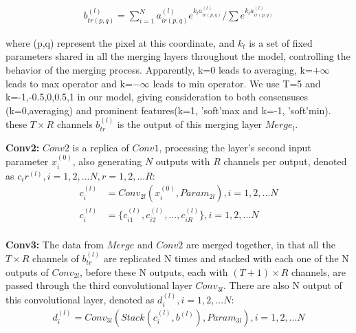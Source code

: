 \begin{equation}\label{eq:6}
    \begin{split}
        b_{tr(p,q)}^{(l)} = \sum_{i=1}^{N} a_{ir(p,q)}^{(l)} e^{k_t a_{ir(p,q)}^{(l)}} /\sum e^{k_t a_{ir(p,q)}^{(l)}}
\end{split}
\end{equation}

where (p,q) represent the pixel at this coordinate, and $k_t$ is a set of fixed parameters shared in all the merging layers throughout the model, controlling the behavior of the merging process. Apparently, k=0 leads to averaging, k=${+\infty}$ leads to max operator and k=${-\infty}$ leads to min operator. We use T=5 and k=-1,-0.5,0,0.5,1 in our model, giving consideration to both consensuses (k=0,averaging) and prominent features(k=1, 'soft'max and k=-1, 'soft'min). these $T\times R$ channels $b_{tr}^{(l)}$ is the output of this merging layer $Merge_l$.

\vspace{1mm}
\noindent
\textbf{Conv2:} $Conv2$ is a replica of $Conv1$, processing the layer's second input parameter $x_i^{(0)}$, also generating $N$ outputs with $R$ channels per output, denoted as $c_ir^{(l)}, i=1,2,...N, r=1,2,...R$:
\begin{equation}\label{eq:7}
    \begin{split}
        c_i^{(l)} &= Conv_{2l}(x_i^{(0)},Param_{2l}), i=1,2,...N\\
        c_i^{(l)} &= \{c_{i1}^{(l)},c_{i2}^{(l)},...,c_{iR}^{(l)}\}, i=1,2,...N\\
\end{split}
\end{equation}

\vspace{1mm}
\noindent
\textbf{Conv3:} The data from $Merge$ and $Conv2$ are merged together, in that all the $T\times R$ channels of $b_{tr}^{(l)}$ are replicated N times and stacked with each one of the N outputs of $Conv_{2l}$, before these N outputs, each with $(T+1)\times R$ channels, are passed through the third convolutional layer $Conv_{3l}$. There are also N output of this convolutional layer, denoted as $d_i^{(l)}, i=1,2,...N$:
\begin{equation}\label{eq:8}
    \begin{split}
        d_i^{(l)} = Conv_{3l}(Stack(c_i^{(l)},b^{(l)}),Param_{3l}), i=1,2,...N 
\end{split}
\end{equation}


